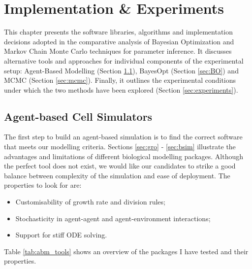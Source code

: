 \documentclass[bsc,frontabs,singlespacing,parskip,deptreport]{infthesis}
\begin{document}
\chapter{Implementation \& Experiments}\label{ch:experiments}

This chapter presents the software libraries, algorithms and implementation decisions adopted in the comparative analysis of Bayesian Optimization and Markov Chain Monte Carlo techniques for parameter inference. It discusses alternative tools and approaches for individual components of the experimental setup: Agent-Based Modelling (Section \ref{sec:abm}), BayesOpt (Section \ref{sec:BO}) and MCMC (Section \ref{sec:mcmc}). Finally, it outlines the experimental conditions under which the two methods have been explored (Section \ref{sec:experiments}).

\section{Agent-based Cell Simulators}\label{sec:abm}
The first step to build an agent-based simulation is to find the correct software that meets our modelling criteria. Sections \ref{sec:gro} - \ref{sec:bsim} illustrate the advantages and limitations of different biological modelling packages. Although the perfect tool does not exist, we would like our candidates to strike a good balance between complexity of the simulation and ease of deployment. The properties to look for are:

\begin{itemize}
    \item Customisability of growth rate and division rules;
    \item Stochasticity in agent-agent and agent-environment interactions;
    \item Support for stiff ODE solving.
\end{itemize}

Table \ref{tab:abm_tools} shows an overview of the packages I have tested and their properties.
\end{document}
